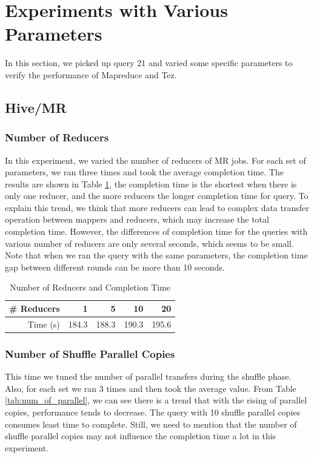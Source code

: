 \documentclass[10pt]{article}
\begin{document}
\section{Experiments with Various Parameters}

In this section, we picked up query 21 and varied some specific parameters to verify the performance of Mapreduce and Tez.

\subsection{Hive/MR}
\subsubsection{Number of Reducers}
In this experiment, we varied the number of reducers of MR jobs. For each set of parameters, we ran three times and took the average completion time. The results are shown in Table \ref{tab:num_of_reducers}, the completion time is the shortest when there is only one reducer, and the more reducers the longer completion time for query. To explain this trend, we think that more reducers can lead to complex data transfer operation between mappers and reducers, which may increase the total completion time. However, the differences of completion time for the queries with various number of reducers are only several seconds, which seems to be small. Note that when we ran the query with the same parameters, the completion time gap between different rounds can be more than 10 seconds.

\begin{table}[htbp]
  \centering
  \caption{Number of Reducers and Completion Time}
    \begin{tabular}{rrrrr}
    \toprule
    \# Reducers & 1     & 5     & 10    & 20 \\
    \midrule
    Time (s) & 184.3 & 188.3 & 190.3 & 195.6 \\
    \bottomrule
    \end{tabular}%
  \label{tab:num_of_reducers}%
\end{table}%

\subsubsection{Number of Shuffle Parallel Copies}

This time we tuned the number of parallel transfers during the shuffle phase. Also, for each set we ran 3 times and then took the average value. From Table \ref{tab:num_of_parallel}, we can see there is a trend that with the rising of parallel copies, performance tends to decrease. The query with 10 shuffle parallel copies consumes least time to complete. Still, we need to mention that the number of shuffle parallel copies may not influence the completion time a lot in this experiment.
\end{document}
